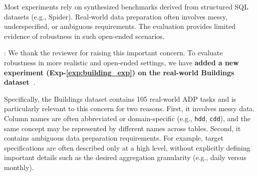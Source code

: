 
\begin{shaded}
{
 Most experiments rely on synthesized benchmarks derived from structured SQL datasets (e.g., Spider). Real-world data preparation often involves messy, underspecified, or ambiguous requirements. The evaluation provides limited evidence of robustness in such open-ended scenarios.
}
\end{shaded}



:
We thank the reviewer for raising this important concern. To evaluate robustness in more realistic and open-ended settings, we have \textbf{added a new experiment (Exp-\ref{exp:building_exp}) on the real-world Buildings dataset~\cite{sharma2023automatic}}.

Specifically, the Buildings dataset contains 105 real-world ADP tasks and is particularly relevant to this concern for two reasons. First, it involves messy data. Column names are often abbreviated or domain-specific (e.g., \texttt{hdd}, \texttt{cdd}), and the same concept may be represented by different names across tables. Second, it contains ambiguous data preparation requirements. For example, target specifications are often described only at a high level, without explicitly defining important details such as the desired aggregation granularity (e.g., daily versus monthly).


